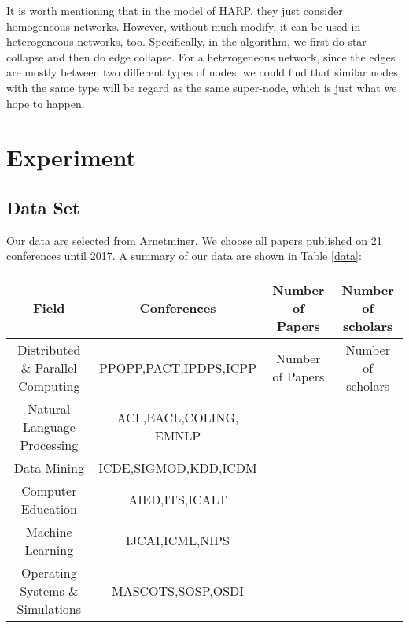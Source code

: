 \documentclass[conference]{IEEEtran}
\begin{document}
It is worth mentioning that in the model of HARP, they just consider homogeneous networks. However, without much modify, it can be used in heterogeneous networks, too. Specifically, in the algorithm, we first do star collapse and then do edge collapse. For a heterogeneous network, since the edges are mostly between two different types of nodes, we could find that similar nodes with the same type will be regard as the same super-node, which is just what we hope to happen.
\section{Experiment}
\subsection{Data Set}
Our data are selected from Arnetminer\cite{tang2008arnetminer}. We choose all papers published on 21 conferences until 2017. A summary of our data are shown in Table \ref{data}:
\begin{table*}[h]
\center
	\begin{tabular}{c|c|c|c}
	\hline
	\textbf{Field} & \textbf{Conferences} & \textbf{Number of Papers}&\textbf{Number of scholars}\\
	\hline
	Distributed \& Parallel Computing & PPOPP,PACT,IPDPS,ICPP & Number of Papers&Number of scholars\\
	\hline
	Natural Language Processing & ACL,EACL,COLING, EMNLP &&\\
	\hline
	Data Mining & ICDE,SIGMOD,KDD,ICDM&&\\
	\hline
	Computer Education & AIED,ITS,ICALT&&\\
	\hline
	Machine Learning &IJCAI,ICML,NIPS&&\\
	\hline
	Operating Systems \& Simulations & MASCOTS,SOSP,OSDI&&\\
	\hline
	\end{tabular}
	\caption{A summary of data.}
	\label{data}
\end{table*}
\end{document}
